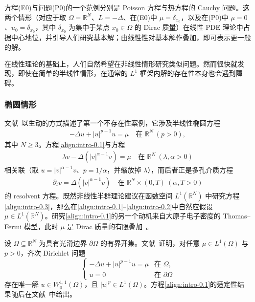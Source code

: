 \documentclass[../main.tex]{subfiles}
\begin{document}
方程(E0)与问题(P0)的一个范例分别是 Poisson 方程与热方程的 Cauchy 问题。这两个情形（对应于取 $\Omega=\mathbb{R}^N$、$L=-\Delta$、在(E0)中 $\mu=\delta_{x_0}$，以及在(P0)中 $\mu=0$、$u_0=\delta_{x_0}$，其中 $\delta_{x_0}$ 为集中于某点 $x_0\in\Omega$ 的 Dirac 质量）在线性 PDE 理论中占据中心地位，并引导人们研究基本解；由线性性对基本解作叠加，即可表示更一般的解。

在线性理论的基础上，人们自然希望在非线性情形研究类似问题。然而很快就发现，即使在简单的半线性情形，在通常的 $L^1$ 框架内解的存在性本身也会遇到障碍。

\subsubsection*{椭圆情形}\label{subsubsection:intro-elliptic}

文献~\cite{ref14}以生动的方式描述了第一个不存在性案例，它涉及半线性椭圆方程
\begin{align}
-\Delta u + |u|^{p-1}u = \mu \quad \text{在 }\mathbb{R}^N\ (p>0), \label{align:intro-0.1}
\end{align}
其中 $N\geqslant 3$。方程\eqref{align:intro-0.1}与方程
\begin{align}
\lambda v - \Delta(|v|^{\alpha-1}v) = \mu \quad \text{在 }\mathbb{R}^N\ (\lambda,\alpha>0) \label{align:intro-0.2}
\end{align}
相关联（取 $u=|v|^{\alpha-1}v$、$p=1/\alpha$，并缩放掉 $\lambda$），而后者正是多孔介质方程
\begin{align}
\partial_t v = \Delta(|v|^{\alpha-1}v) \quad \text{在 }\mathbb{R}^N\times(0,T)\ (\alpha,T>0) \label{align:intro-0.3}
\end{align}
的 resolvent 方程。既然非线性半群理论建议在函数空间 $L^1(\mathbb{R}^N)$ 中研究方程\eqref{align:intro-0.3}，那么在\eqref{align:intro-0.1}–\eqref{align:intro-0.2}中自然应假设 $\mu\in L^1(\mathbb{R}^N)$。研究\eqref{align:intro-0.1}的另一个动机来自大原子电子密度的 Thomas--Fermi 模型，此时 $\mu$ 是 Dirac 质量的有限叠加~\cite{ref65}。

设 $\Omega\subseteq\mathbb{R}^N$ 为具有光滑边界 $\partial\Omega$ 的有界开集。文献~\cite{ref28}证明，对任意 $\mu\in L^1(\Omega)$ 与 $p>0$，齐次 Dirichlet 问题
\[
\begin{cases}
-\Delta u + |u|^{p-1}u = \mu & \text{在 }\Omega,\\
u=0 & \text{在 }\partial\Omega
\end{cases}
\]
存在唯一解 $u\in W^{1,1}_0(\Omega)$，且 $|u|^p\in L^1(\Omega)$。方程\eqref{align:intro-0.1}的适定性结果随后在文献~\cite{ref15}中给出。
\end{document}
